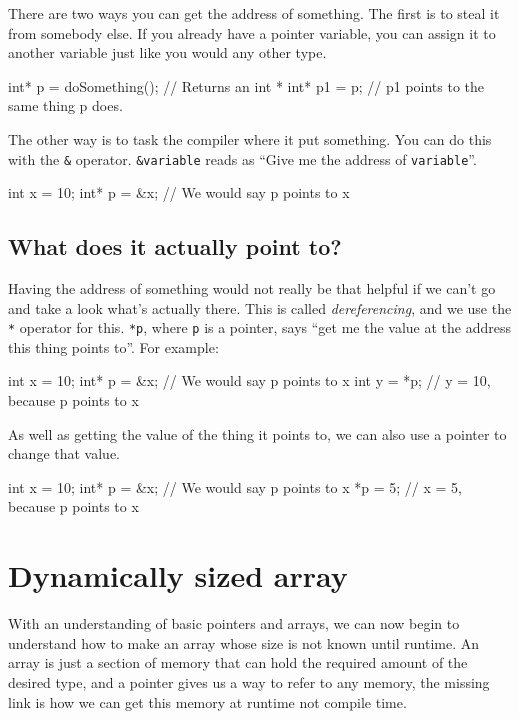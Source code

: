 There are two ways you can get the address of something.
The first is to steal it from somebody else.
If you already have a pointer variable, you can assign it to another variable just like you would any other type.

\begin{codeblock}
int* p = doSomething(); // Returns an int *
int* p1 = p; // p1 points to the same thing p does.
\end{codeblock}

The other way is to task the compiler where it put something.
You can do this with the \texttt{\&} operator.
\texttt{\&variable} reads as ``Give me the address of \texttt{variable}''.

\begin{codeblock}
int x = 10;
int* p = &x; // We would say p points to x
\end{codeblock}

\subsection{What does it actually point to?}

Having the address of something would not really be that helpful if we can't go and take a look what's actually there.
This is called \emph{dereferencing}, and we use the \texttt{*} operator for this.
\texttt{*p}, where \texttt{p} is a pointer, says ``get me the value at the address this thing points to''.
For example:

\begin{codeblock}
int x = 10;
int* p = &x; // We would say p points to x
int y = *p; // y = 10, because p points to x
\end{codeblock}

As well as getting the value of the thing it points to, we can also use a pointer to change that value.

\begin{codeblock}
int x = 10;
int* p = &x; // We would say p points to x
*p = 5; // x = 5, because p points to x
\end{codeblock}

\section{Dynamically sized array}

With an understanding of basic pointers and arrays, we can now begin to understand how to make an array whose size is not known until runtime.
An array is just a section of memory that can hold the required amount of the desired type, and a pointer gives us a way to refer to any memory, the missing link is how we can get this memory at runtime not compile time.

